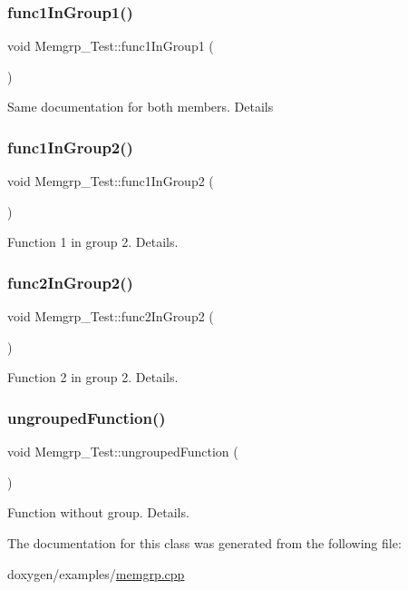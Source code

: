 \subsubsection{\texorpdfstring{func1InGroup1()}{func1InGroup1()}}
{\footnotesize\ttfamily void Memgrp\+\_\+\+Test\+::func1\+In\+Group1 (\begin{DoxyParamCaption}{ }\end{DoxyParamCaption})}

Same documentation for both members. Details \mbox{\label{class_memgrp___test_ab0e6553ddc36ac3cef0ac229c5dd4cdb}} 
\subsubsection{\texorpdfstring{func1InGroup2()}{func1InGroup2()}}
{\footnotesize\ttfamily void Memgrp\+\_\+\+Test\+::func1\+In\+Group2 (\begin{DoxyParamCaption}{ }\end{DoxyParamCaption})}

Function 1 in group 2. Details. \mbox{\label{class_memgrp___test_a9ce862049bb543596343e81ad3ddddff}} 
\subsubsection{\texorpdfstring{func2InGroup2()}{func2InGroup2()}}
{\footnotesize\ttfamily void Memgrp\+\_\+\+Test\+::func2\+In\+Group2 (\begin{DoxyParamCaption}{ }\end{DoxyParamCaption})\hspace{0.3cm}{\ttfamily [protected]}}

Function 2 in group 2. Details. \mbox{\label{class_memgrp___test_a8a3a4ac34b2e25696159ac420bd4bdc6}} 
\subsubsection{\texorpdfstring{ungroupedFunction()}{ungroupedFunction()}}
{\footnotesize\ttfamily void Memgrp\+\_\+\+Test\+::ungrouped\+Function (\begin{DoxyParamCaption}{ }\end{DoxyParamCaption})}

Function without group. Details. 

The documentation for this class was generated from the following file\+:\begin{DoxyCompactItemize}
\item 
doxygen/examples/\mbox{\hyperlink{memgrp_8cpp}{memgrp.\+cpp}}\end{DoxyCompactItemize}
